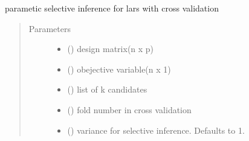 \documentclass[letterpaper,10pt,english]{sphinxmanual}
\begin{document}
\label{\detokenize{selective:module-selective_inference.lars_si}}

\begin{fulllineitems}
\label{\detokenize{selective:selective_inference.lars_si.parametric_lars_cv_si}}
parametic selective inference for lars with cross validation
\begin{quote}\begin{description}
\item[{Parameters}] \leavevmode\begin{itemize}
\item {} 
 () \textendash{} design matrix(n x p)

\item {} 
 () \textendash{} obejective variable(n x 1)

\item {} 
 (\sphinxstyleliteralemphasis{\sphinxupquote{{[}}}\sphinxstyleliteralemphasis{\sphinxupquote{{]}}}) \textendash{} list of k candidates

\item {} 
 () \textendash{} fold number in cross validation

\item {} 
 (\sphinxstyleliteralemphasis{\sphinxupquote{, }}) \textendash{} variance for selective inference. Defaults to 1.


\end{itemize}
\end{description}
\end{quote}
\end{fulllineitems}
\end{document}
